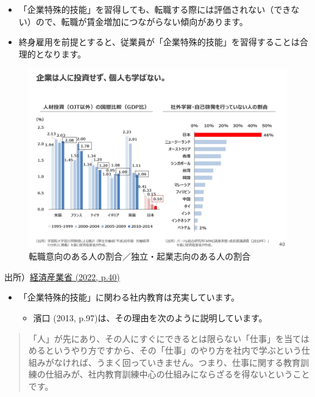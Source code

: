 \documentclass[
]{book}
\providecommand{\tightlist}{%
  \setlength{\itemsep}{0pt}\setlength{\parskip}{0pt}}
\begin{document}
\begin{itemize}
\begin{itemize}
    \begin{itemize}
    \item
      「企業特殊的技能」を習得しても、転職する際には評価されない（できない）ので、転職が賃金増加につながらない傾向があります。
    \item
      終身雇用を前提とすると、従業員が「企業特殊的技能」を習得することは合理的となります。
    \end{itemize}
  \end{itemize}
\end{itemize}

\begin{figure}
\includegraphics[width=960px]{miti_page-0041} \caption{転職意向のある人の割合／独立・起業志向のある人の割合}\label{fig:HRinvestment}
\end{figure}

出所）\href{https://www.meti.go.jp/press/2022/05/20220531001/20220531001-1.pdf}{経済産業省 (2022, p.40)}

\begin{itemize}
\item
  「企業特殊的技能」に関わる社内教育は充実しています。

  \begin{itemize}
  \tightlist
  \item
    濱口 (2013, p.97)は、その理由を次のように説明しています。
  \end{itemize}
\end{itemize}

\begin{quote}
「人」が先にあり、その人にすぐにできるとは限らない「仕事」を当てはめるというやり方ですから、その「仕事」のやり方を社内で学ぶという仕組みがなければ、うまく回っていきません。つまり、仕事に関する教育訓練の仕組みが、社内教育訓練中心の仕組みにならざるを得ないということです。
\end{quote}
\end{document}
